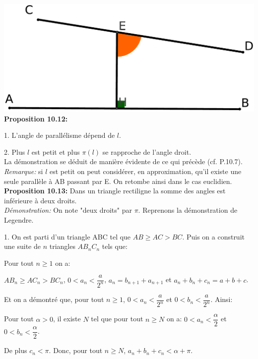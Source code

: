 \documentclass[a4paper, 12pt, twoside]{book}
\begin{document}
     \includegraphics[scale=0.1]{figures/Lobat21.eps}\\
     
     \textbf{Proposition 10.12:} \
     
     1. L'angle de parallélisme dépend de $l$.\
     
     2. Plus $l$ est petit et plus $\pi(l)$  se rapproche de l'angle droit.\\
     
     La démonstration se déduit de manière évidente de ce qui précède (cf. P.10.7).\\
     
     
     \textit{Remarque:} si $l$ est petit on peut considérer, en approximation, qu'il existe une seule parallèle à AB passant par E. On retombe ainsi dans le cas euclidien.\\
     
     \textbf{Proposition 10.13:} Dans un triangle rectiligne la somme des angles est inférieure à deux droits.\\
     
     \textit{Démonstration:} On note "deux droits" par $\pi$.  Reprenons la démonstration de Legendre.\
     
   1.  On est parti d'un triangle ABC tel que $AB\geq AC>BC$. Puis on a construit une suite de $n$ triangles $AB_{n}C_{n}$ tels que:\
     
     Pour tout $n\geq 1$ on a:\
     
      $AB_{n}\geq AC_{n}>BC_{n}$, $0<a_{n}<\dfrac{a}{2^{n}}$, $a_{n}=b_{n+1}+a_{n+1}$ et $a_{n}+b_{n}+c_{n}=a+b+c$.\
     
Et on a démontré que, pour tout  $n\geq 1$, $ 0<a_{n}<\dfrac{a}{2^{n}}$ et  $0<b_{n}<  \dfrac{a}{2^{n}}$. Ainsi:\ 

Pour tout $\alpha>0$, il existe $N$ tel que pour tout $n\geq N$ on a: $ 0<a_{n}<\dfrac{\alpha}{2}$ et  $0<b_{n}<  \dfrac{\alpha}{2}$.\

De plus $c_{n }<\pi$. Donc, pour tout $n\geq N$, $a_{n}+b_{n}+c_{n}<\alpha+\pi$.\
\end{document}
